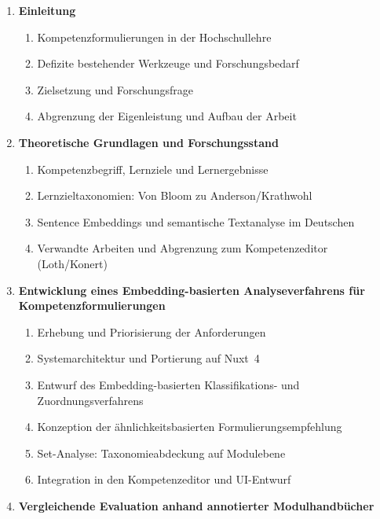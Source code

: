 \documentclass[12pt,a4paper]{article}
\begin{document}
\begin{enumerate}[leftmargin=1.5em, itemsep=1pt, parsep=0pt]
  \item \textbf{Einleitung}
    \begin{enumerate}[leftmargin=1.5em, itemsep=0pt, parsep=0pt, topsep=2pt]
      \item Kompetenzformulierungen in der Hochschullehre
      \item Defizite bestehender Werkzeuge und Forschungsbedarf
      \item Zielsetzung und Forschungsfrage
      \item Abgrenzung der Eigenleistung und Aufbau der Arbeit
    \end{enumerate}
  \item \textbf{Theoretische Grundlagen und Forschungsstand}
    \begin{enumerate}[leftmargin=1.5em, itemsep=0pt, parsep=0pt, topsep=2pt]
      \item Kompetenzbegriff, Lernziele und Lernergebnisse
      \item Lernzieltaxonomien: Von Bloom zu Anderson/Krathwohl
      \item Sentence Embeddings und semantische Textanalyse im Deutschen
      \item Verwandte Arbeiten und Abgrenzung zum Kompetenzeditor (Loth/Konert)
    \end{enumerate}
  \item \textbf{Entwicklung eines Embedding-basierten Analyseverfahrens f\"ur Kompetenz\-formulierungen}
    \begin{enumerate}[leftmargin=1.5em, itemsep=0pt, parsep=0pt, topsep=2pt]
      \item Erhebung und Priorisierung der Anforderungen
      \item Systemarchitektur und Portierung auf Nuxt~4
      \item Entwurf des Embedding-basierten Klassifikations- und Zuordnungsverfahrens
      \item Konzeption der \"ahnlichkeitsbasierten Formulierungsempfehlung
      \item Set-Analyse: Taxonomieabdeckung auf Modulebene
      \item Integration in den Kompetenzeditor und UI-Entwurf
    \end{enumerate}
  \item \textbf{Vergleichende Evaluation anhand annotierter Modulhandb\"ucher}
    \begin{enumerate}[leftmargin=1.5em, itemsep=0pt, parsep=0pt, topsep=2pt]

\end{enumerate}
\end{enumerate}
\end{document}
